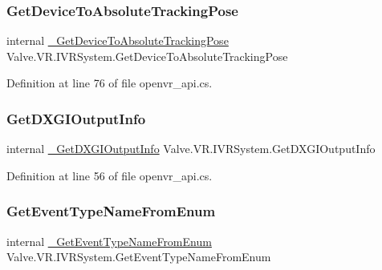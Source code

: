 \mbox{\label{struct_valve_1_1_v_r_1_1_i_v_r_system_ad82a0592fe681a8e3eece30c2bf2ea2d}} 
\subsubsection{\texorpdfstring{GetDeviceToAbsoluteTrackingPose}{GetDeviceToAbsoluteTrackingPose}}
{\footnotesize\ttfamily internal \mbox{\hyperlink{struct_valve_1_1_v_r_1_1_i_v_r_system_aaea53504ce1e2a5c54baaaa6d1ad2d40}{\+\_\+\+Get\+Device\+To\+Absolute\+Tracking\+Pose}} Valve.\+V\+R.\+I\+V\+R\+System.\+Get\+Device\+To\+Absolute\+Tracking\+Pose}



Definition at line 76 of file openvr\+\_\+api.\+cs.

\mbox{\label{struct_valve_1_1_v_r_1_1_i_v_r_system_a433e3147a2f1d989802a8087752bf02c}} 
\subsubsection{\texorpdfstring{GetDXGIOutputInfo}{GetDXGIOutputInfo}}
{\footnotesize\ttfamily internal \mbox{\hyperlink{struct_valve_1_1_v_r_1_1_i_v_r_system_ab24a286fab0641489f5da8a338858169}{\+\_\+\+Get\+D\+X\+G\+I\+Output\+Info}} Valve.\+V\+R.\+I\+V\+R\+System.\+Get\+D\+X\+G\+I\+Output\+Info}



Definition at line 56 of file openvr\+\_\+api.\+cs.

\mbox{\label{struct_valve_1_1_v_r_1_1_i_v_r_system_aeff0e53b53082e6fd51aa033513cabbf}} 
\subsubsection{\texorpdfstring{GetEventTypeNameFromEnum}{GetEventTypeNameFromEnum}}
{\footnotesize\ttfamily internal \mbox{\hyperlink{struct_valve_1_1_v_r_1_1_i_v_r_system_a31f48cf54b258ae76bcfc5444ee883c8}{\+\_\+\+Get\+Event\+Type\+Name\+From\+Enum}} Valve.\+V\+R.\+I\+V\+R\+System.\+Get\+Event\+Type\+Name\+From\+Enum}



